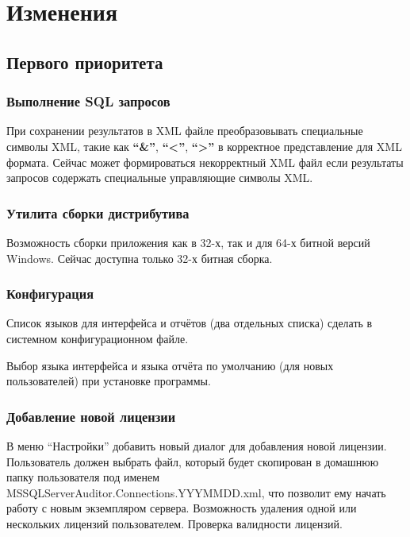 \section{Изменения}

\subsection{Первого приоритета}

\subsubsection{Выполнение SQL запросов}

При сохранении результатов в XML файле преобразовывать специальные символы XML, такие как
\textbf{``\&''}, \textbf{``<''}, \textbf{``>''} в корректное представление для XML формата. Сейчас
может формироваться некорректный XML файл если результаты запросов содержать специальные управляющие
символы XML.

\subsubsection{Утилита сборки дистрибутива}

Возможность сборки приложения как в 32-х, так и для 64-х битной версий Windows. Сейчас доступна
только 32-х битная сборка.

\subsubsection{Конфигурация}

Список языков для интерфейса и отчётов (два отдельных списка) сделать в системном конфигурационном
файле.

\bigskip

Выбор языка интерфейса и языка отчёта по умолчанию (для новых пользователей) при установке
программы.

\subsubsection{Добавление новой лицензии}

В меню ``Настройки'' добавить новый диалог для добавления новой лицензии. Пользователь должен
выбрать файл, который будет скопирован в домашнюю папку пользователя под именем
MSSQL\-Server\-Auditor.Connec\-tions.YYYMMDD.xml, что позволит ему начать работу с новым экземпляром
сервера. Возможность удаления одной или нескольких лицензий пользователем. Проверка валидности
лицензий.

